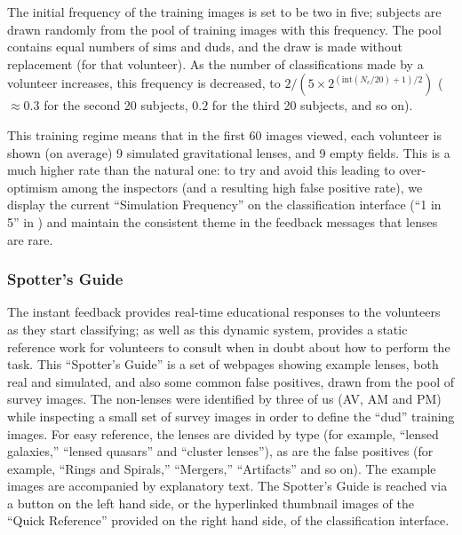\documentclass[useAMS,usenatbib,a4paper]{mn2e}
\begin{document}

The initial frequency of the training images is set to be two in five;
subjects are drawn randomly from the pool of training images with this
frequency. The pool contains equal numbers of sims and duds, and the draw is
made without replacement (for that volunteer). As the number of
classifications made by a volunteer increases, this frequency is decreased, to
$2/(5\times2^{(\textrm{int}(N_c/20)+1)/2})$ ($\approx 0.3$ for the second 20
subjects, $0.2$ for the third 20 subjects, and so on).

This training regime means that in the first 60 images viewed, each volunteer
is shown (on average) 9 simulated gravitational lenses, and 9 empty fields. 
This is a much higher rate than the natural one: to try and avoid this leading
to over-optimism among the inspectors (and a resulting high false positive
rate), we display the current ``Simulation Frequency'' on the classification
interface (``1 in 5'' in ) and maintain the consistent
theme in the feedback messages that lenses are rare.


\subsubsection{Spotter's Guide}

The instant feedback provides real-time educational responses to the
volunteers as they start classifying; as well as this dynamic system, \sw
provides a static reference work for volunteers to consult when in doubt about
how to perform the task. This ``Spotter's Guide'' is a set of webpages showing
example lenses, both real and simulated, and also some common false positives,
drawn from the pool of survey images. The non-lenses were identified by three
of us (AV, AM and PM) while inspecting a small set of survey images in order
to define the ``dud'' training images. For easy reference, the lenses are
divided by type (for example, ``lensed galaxies,'' ``lensed quasars'' and
``cluster lenses''), as are the false positives (for example, ``Rings and
Spirals,'' ``Mergers,'' ``Artifacts'' and so on). The example images are
accompanied by explanatory text. The Spotter's Guide is reached via a button
on the left hand side, or the hyperlinked thumbnail images of the ``Quick
Reference'' provided on the right hand side, of the classification interface.
\end{document}
